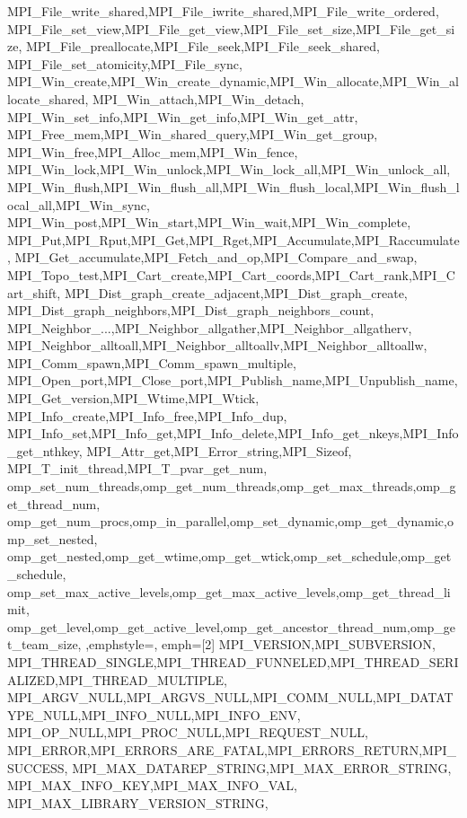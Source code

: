 {{    MPI_File_write_shared,MPI_File_iwrite_shared,MPI_File_write_ordered,
    MPI_File_set_view,MPI_File_get_view,MPI_File_set_size,MPI_File_get_size,
    MPI_File_preallocate,MPI_File_seek,MPI_File_seek_shared,
    MPI_File_set_atomicity,MPI_File_sync,
    MPI_Win_create,MPI_Win_create_dynamic,MPI_Win_allocate,MPI_Win_allocate_shared,
    MPI_Win_attach,MPI_Win_detach,
    MPI_Win_set_info,MPI_Win_get_info,MPI_Win_get_attr,
    MPI_Free_mem,MPI_Win_shared_query,MPI_Win_get_group,
    MPI_Win_free,MPI_Alloc_mem,MPI_Win_fence,
    MPI_Win_lock,MPI_Win_unlock,MPI_Win_lock_all,MPI_Win_unlock_all,
    MPI_Win_flush,MPI_Win_flush_all,MPI_Win_flush_local,MPI_Win_flush_local_all,MPI_Win_sync,
    MPI_Win_post,MPI_Win_start,MPI_Win_wait,MPI_Win_complete,
    MPI_Put,MPI_Rput,MPI_Get,MPI_Rget,MPI_Accumulate,MPI_Raccumulate,
    MPI_Get_accumulate,MPI_Fetch_and_op,MPI_Compare_and_swap,
    MPI_Topo_test,MPI_Cart_create,MPI_Cart_coords,MPI_Cart_rank,MPI_Cart_shift,
    MPI_Dist_graph_create_adjacent,MPI_Dist_graph_create,
    MPI_Dist_graph_neighbors,MPI_Dist_graph_neighbors_count,
    MPI_Neighbor_...,MPI_Neighbor_allgather,MPI_Neighbor_allgatherv,
    MPI_Neighbor_alltoall,MPI_Neighbor_alltoallv,MPI_Neighbor_alltoallw,
    MPI_Comm_spawn,MPI_Comm_spawn_multiple,
    MPI_Open_port,MPI_Close_port,MPI_Publish_name,MPI_Unpublish_name,
    MPI_Get_version,MPI_Wtime,MPI_Wtick,
    MPI_Info_create,MPI_Info_free,MPI_Info_dup,
    MPI_Info_set,MPI_Info_get,MPI_Info_delete,MPI_Info_get_nkeys,MPI_Info_get_nthkey,
    MPI_Attr_get,MPI_Error_string,MPI_Sizeof,
    MPI_T_init_thread,MPI_T_pvar_get_num,
    omp_set_num_threads,omp_get_num_threads,omp_get_max_threads,omp_get_thread_num,
    omp_get_num_procs,omp_in_parallel,omp_set_dynamic,omp_get_dynamic,omp_set_nested,
    omp_get_nested,omp_get_wtime,omp_get_wtick,omp_set_schedule,omp_get_schedule,
    omp_set_max_active_levels,omp_get_max_active_levels,omp_get_thread_limit,
    omp_get_level,omp_get_active_level,omp_get_ancestor_thread_num,omp_get_team_size,
  },emphstyle={\color{red!70!black}\bfseries},
  emph={[2] %
    MPI_VERSION,MPI_SUBVERSION,
    MPI_THREAD_SINGLE,MPI_THREAD_FUNNELED,MPI_THREAD_SERIALIZED,MPI_THREAD_MULTIPLE,
    MPI_ARGV_NULL,MPI_ARGVS_NULL,MPI_COMM_NULL,MPI_DATATYPE_NULL,MPI_INFO_NULL,MPI_INFO_ENV,
    MPI_OP_NULL,MPI_PROC_NULL,MPI_REQUEST_NULL,
    MPI_ERROR,MPI_ERRORS_ARE_FATAL,MPI_ERRORS_RETURN,MPI_SUCCESS,
    MPI_MAX_DATAREP_STRING,MPI_MAX_ERROR_STRING,
    MPI_MAX_INFO_KEY,MPI_MAX_INFO_VAL, MPI_MAX_LIBRARY_VERSION_STRING,
}}
